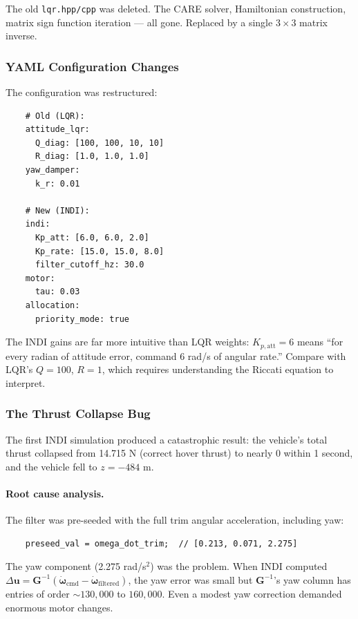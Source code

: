 \documentclass[12pt, a4paper]{article}
\newcommand{\bu}{\bm{u}}
\newcommand{\bomega}{\bm{\omega}}
\begin{document}
The old \texttt{lqr.hpp/cpp} was deleted.  The CARE solver, Hamiltonian construction, matrix sign function iteration --- all gone.  Replaced by a single $3 \times 3$ matrix inverse.

\subsubsection{YAML Configuration Changes}

The configuration was restructured:
\begin{verbatim}
    # Old (LQR):
    attitude_lqr:
      Q_diag: [100, 100, 10, 10]
      R_diag: [1.0, 1.0, 1.0]
    yaw_damper:
      k_r: 0.01

    # New (INDI):
    indi:
      Kp_att: [6.0, 6.0, 2.0]
      Kp_rate: [15.0, 15.0, 8.0]
      filter_cutoff_hz: 30.0
    motor:
      tau: 0.03
    allocation:
      priority_mode: true
\end{verbatim}

The INDI gains are far more intuitive than LQR weights: $K_{p,\text{att}} = 6$ means ``for every radian of attitude error, command 6 rad/s of angular rate.''  Compare with LQR's $Q = 100$, $R = 1$, which requires understanding the Riccati equation to interpret.

\subsubsection{The Thrust Collapse Bug}
\label{sec:thrust_collapse}

The first INDI simulation produced a catastrophic result: the vehicle's total thrust collapsed from 14.715 N (correct hover thrust) to nearly 0 within 1 second, and the vehicle fell to $z = -484$ m.

\paragraph{Root cause analysis.}  The filter was pre-seeded with the full trim angular acceleration, including yaw:
\begin{verbatim}
    preseed_val = omega_dot_trim;  // [0.213, 0.071, 2.275]
\end{verbatim}

The yaw component (2.275 rad/s$^2$) was the problem.  When INDI computed $\Delta\bu = \bm{G}^{-1}(\dot{\bomega}_{\text{cmd}} - \dot{\bomega}_{\text{filtered}})$, the yaw error was small but $\bm{G}^{-1}$'s yaw column has entries of order $\sim 130{,}000$ to $160{,}000$.  Even a modest yaw correction demanded enormous motor changes.
\end{document}
